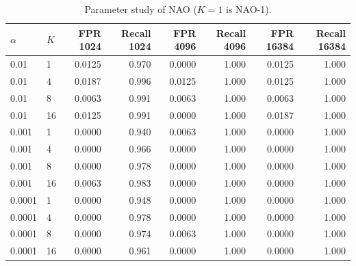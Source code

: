 \begin{table}[t]
\centering
\caption{Parameter study of NAO ($K = 1$ is NAO-1).}
\label{tab:app-grid}
\small
\begin{tabular}{llrrrrrr}
\toprule
$\alpha$ & $K$ & FPR 1024 & Recall 1024 & FPR 4096 & Recall 4096 & FPR 16384 & Recall 16384 \\
\midrule
0.01 & 1 & 0.0125 & 0.970 & 0.0000 & 1.000 & 0.0125 & 1.000 \\
0.01 & 4 & 0.0187 & 0.996 & 0.0125 & 1.000 & 0.0125 & 1.000 \\
0.01 & 8 & 0.0063 & 0.991 & 0.0063 & 1.000 & 0.0063 & 1.000 \\
0.01 & 16 & 0.0125 & 0.991 & 0.0000 & 1.000 & 0.0187 & 1.000 \\
0.001 & 1 & 0.0000 & 0.940 & 0.0063 & 1.000 & 0.0000 & 1.000 \\
0.001 & 4 & 0.0000 & 0.966 & 0.0000 & 1.000 & 0.0000 & 1.000 \\
0.001 & 8 & 0.0000 & 0.978 & 0.0000 & 1.000 & 0.0000 & 1.000 \\
0.001 & 16 & 0.0063 & 0.983 & 0.0000 & 1.000 & 0.0000 & 1.000 \\
0.0001 & 1 & 0.0000 & 0.948 & 0.0000 & 1.000 & 0.0000 & 1.000 \\
0.0001 & 4 & 0.0000 & 0.978 & 0.0000 & 1.000 & 0.0000 & 1.000 \\
0.0001 & 8 & 0.0000 & 0.974 & 0.0063 & 1.000 & 0.0000 & 1.000 \\
0.0001 & 16 & 0.0000 & 0.961 & 0.0000 & 1.000 & 0.0000 & 1.000 \\
\bottomrule
\end{tabular}
\end{table}

